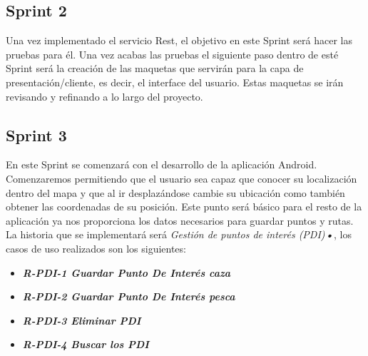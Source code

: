 \subsection{Sprint 2}
 Una vez implementado el servicio Rest, el objetivo en este Sprint será hacer las pruebas para él.
 Una vez acabas las pruebas el siguiente paso dentro de esté Sprint será la creación de las maquetas que servirán para la capa de presentación/cliente, es decir, el interface del usuario. Estas maquetas se irán revisando y refinando a lo largo del proyecto.
 
\subsection{Sprint 3}

En este Sprint se comenzará con el desarrollo de la aplicación Android. Comenzaremos permitiendo que el usuario sea capaz que conocer su localización dentro del mapa y que al ir desplazándose cambie su ubicación como también obtener las coordenadas de su posición. Este punto será básico para el resto de la aplicación ya nos proporciona los datos necesarios para guardar puntos y rutas. La historia que se implementará será \textit{Gestión de puntos de interés (PDI)\textbf{•}}, los casos de uso realizados son los siguientes:

\begin{itemize}

\item\textbf{\textit{ R-PDI-1 Guardar Punto De Interés caza}}
\item\textit{ \textbf{R-PDI-2 Guardar Punto De Interés pesca}}
\item \textbf{\textit{R-PDI-3 Eliminar PDI}}
\item \textbf{\textit{R-PDI-4 Buscar los PDI}}
\end{itemize} 


